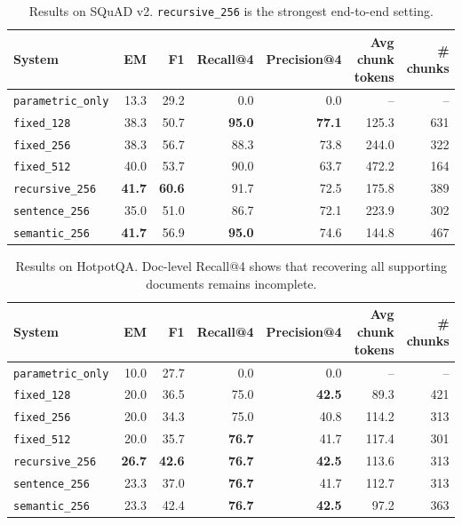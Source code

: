 \documentclass[11pt]{article}
\begin{document}
\begin{table}[t]
\centering
\small
\begin{tabular}{lrrrrrr}
\toprule
System & EM & F1 & Recall@4 & Precision@4 & Avg chunk tokens & \# chunks \\
\midrule
\texttt{parametric\_only} & 13.3 & 29.2 & 0.0 & 0.0 & -- & -- \\
\texttt{fixed\_128}       & 38.3 & 50.7 & \textbf{95.0} & \textbf{77.1} & 125.3 & 631 \\
\texttt{fixed\_256}       & 38.3 & 56.7 & 88.3 & 73.8 & 244.0 & 322 \\
\texttt{fixed\_512}       & 40.0 & 53.7 & 90.0 & 63.7 & 472.2 & 164 \\
\texttt{recursive\_256}   & \textbf{41.7} & \textbf{60.6} & 91.7 & 72.5 & 175.8 & 389 \\
\texttt{sentence\_256}    & 35.0 & 51.0 & 86.7 & 72.1 & 223.9 & 302 \\
\texttt{semantic\_256}    & \textbf{41.7} & 56.9 & \textbf{95.0} & 74.6 & 144.8 & 467 \\
\bottomrule
\end{tabular}
\caption{Results on SQuAD v2. \texttt{recursive\_256} is the strongest end-to-end setting.}
\label{tab:squad}
\end{table}

\begin{table}[t]
\centering
\small
\begin{tabular}{lrrrrrr}
\toprule
System & EM & F1 & Recall@4 & Precision@4 & Avg chunk tokens & \# chunks \\
\midrule
\texttt{parametric\_only} & 10.0 & 27.7 & 0.0 & 0.0 & -- & -- \\
\texttt{fixed\_128}       & 20.0 & 36.5 & 75.0 & \textbf{42.5} & 89.3  & 421 \\
\texttt{fixed\_256}       & 20.0 & 34.3 & 75.0 & 40.8 & 114.2 & 313 \\
\texttt{fixed\_512}       & 20.0 & 35.7 & \textbf{76.7} & 41.7 & 117.4 & 301 \\
\texttt{recursive\_256}   & \textbf{26.7} & \textbf{42.6} & \textbf{76.7} & \textbf{42.5} & 113.6 & 313 \\
\texttt{sentence\_256}    & 23.3 & 37.0 & \textbf{76.7} & 41.7 & 112.7 & 313 \\
\texttt{semantic\_256}    & 23.3 & 42.4 & \textbf{76.7} & \textbf{42.5} & 97.2  & 363 \\
\bottomrule
\end{tabular}
\caption{Results on HotpotQA. Doc-level Recall@4 shows that recovering all supporting
documents remains incomplete.}
\label{tab:hotpot}
\end{table}
\end{document}
